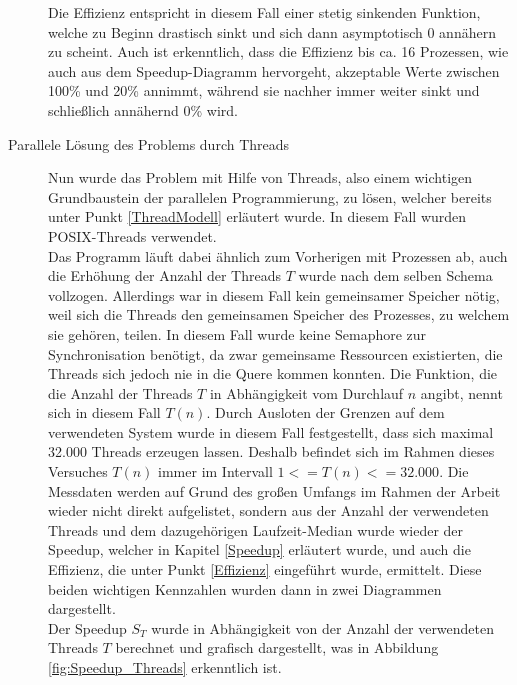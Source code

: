 \begin{description}
						Die Effizienz entspricht in diesem Fall einer stetig sinkenden Funktion, welche zu Beginn drastisch sinkt und sich dann asymptotisch 0 annähern zu scheint. Auch ist erkenntlich, dass die Effizienz bis ca. 16 Prozessen, wie auch aus dem Speedup-Diagramm hervorgeht, akzeptable Werte zwischen 100\% und 20\% annimmt, während sie nachher immer weiter sinkt und schließlich annähernd 0\% wird.
						
						\item[Parallele Lösung des Problems durch Threads]
						
						Nun wurde das Problem mit Hilfe von Threads, also einem wichtigen Grundbaustein der parallelen Programmierung, zu lösen, welcher bereits unter Punkt \ref{ThreadModell} erläutert wurde. In diesem Fall wurden POSIX-Threads verwendet.\\
						Das Programm läuft dabei ähnlich zum Vorherigen mit Prozessen ab, auch die Erhöhung der Anzahl der Threads $T$ wurde nach dem selben Schema vollzogen. Allerdings war in diesem Fall kein gemeinsamer Speicher nötig, weil sich die Threads den gemeinsamen Speicher des Prozesses, zu welchem sie gehören, teilen. In diesem Fall wurde keine Semaphore zur Synchronisation benötigt, da zwar gemeinsame Ressourcen existierten, die Threads sich jedoch nie in die Quere kommen konnten. Die Funktion, die die Anzahl der Threads $T$ in Abhängigkeit vom Durchlauf $n$ angibt, nennt sich in diesem Fall $T(n)$.
						Durch Ausloten der Grenzen auf dem verwendeten System wurde in diesem Fall festgestellt, dass sich maximal 32.000 Threads erzeugen lassen. Deshalb befindet sich im Rahmen dieses Versuches $T(n)$ immer im Intervall $1 <= T(n) <= 32.000$.
						Die Messdaten werden auf Grund des großen Umfangs im Rahmen der Arbeit wieder nicht direkt aufgelistet, sondern aus der Anzahl der verwendeten Threads und dem dazugehörigen Laufzeit-Median wurde wieder der Speedup, welcher in Kapitel \ref{Speedup} erläutert wurde, und auch die Effizienz, die unter Punkt \ref{Effizienz} eingeführt wurde, ermittelt. Diese beiden wichtigen Kennzahlen wurden dann in zwei Diagrammen dargestellt.\\
						Der Speedup $S_T$ wurde in Abhängigkeit von der Anzahl der verwendeten Threads $T$ berechnet und grafisch dargestellt, was in Abbildung \ref{fig:Speedup_Threads} erkenntlich ist.
						

\end{description}
